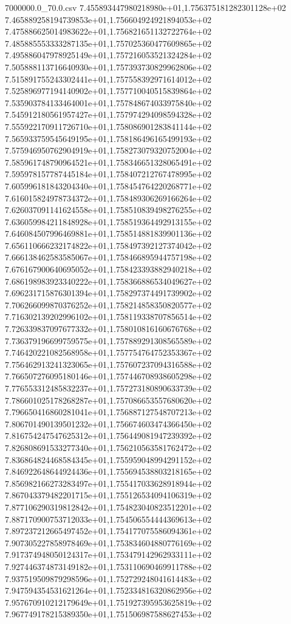 \begin{filecontents*}{7000000.0_70.0.csv}
7.455893447980218980e+01,1.756375181282301128e+02
7.465889258194739853e+01,1.756604924921894053e+02
7.475886625014983622e+01,1.756821651132722764e+02
7.485885553333287135e+01,1.757025360477609865e+02
7.495886047978925149e+01,1.757216053521324284e+02
7.505888113716640930e+01,1.757393730829962806e+02
7.515891755243302441e+01,1.757558392971614012e+02
7.525896977194140902e+01,1.757710040515839864e+02
7.535903784133464001e+01,1.757848674033975840e+02
7.545912180561957427e+01,1.757974294098594328e+02
7.555922170911726710e+01,1.758086901283841144e+02
7.565933759545649195e+01,1.758186496165499193e+02
7.575946950762904919e+01,1.758273079320752004e+02
7.585961748790964521e+01,1.758346651328065491e+02
7.595978157787445184e+01,1.758407212767478995e+02
7.605996181843204340e+01,1.758454764220268771e+02
7.616015824978734372e+01,1.758489306269166264e+02
7.626037091141624558e+01,1.758510839498276255e+02
7.636059984211848928e+01,1.758519364492913155e+02
7.646084507996469881e+01,1.758514881839901136e+02
7.656110666232174822e+01,1.758497392127374042e+02
7.666138462583585067e+01,1.758466895944757198e+02
7.676167900640695052e+01,1.758423393882940218e+02
7.686198983923340222e+01,1.758366886534049627e+02
7.696231715876301394e+01,1.758297374491739902e+02
7.706266099870376252e+01,1.758214858350820577e+02
7.716302139202996102e+01,1.758119338707856514e+02
7.726339837097677332e+01,1.758010816160676768e+02
7.736379196699759575e+01,1.757889291308565589e+02
7.746420221082568958e+01,1.757754764752353367e+02
7.756462913241323065e+01,1.757607237094316588e+02
7.766507276095180146e+01,1.757446708938605298e+02
7.776553312485832237e+01,1.757273180890633739e+02
7.786601025178268287e+01,1.757086653557680620e+02
7.796650416860281041e+01,1.756887127548707213e+02
7.806701490139501232e+01,1.756674603474366450e+02
7.816754247547625312e+01,1.756449081947239392e+02
7.826808691533277340e+01,1.756210563581762472e+02
7.836864824468584345e+01,1.755959048994291152e+02
7.846922648644924436e+01,1.755694538803218165e+02
7.856982166273283497e+01,1.755417033628918944e+02
7.867043379482201715e+01,1.755126534094106319e+02
7.877106290319812842e+01,1.754823040823512201e+02
7.887170900753712033e+01,1.754506554444369613e+02
7.897237212665497452e+01,1.754177075586094361e+02
7.907305227858978469e+01,1.753834604880776169e+02
7.917374948050124317e+01,1.753479142962933111e+02
7.927446374873149182e+01,1.753110690469911788e+02
7.937519509879298596e+01,1.752729248041614483e+02
7.947594354531621264e+01,1.752334816320862956e+02
7.957670910212179649e+01,1.751927395953625819e+02
7.967749178215389350e+01,1.751506987588627453e+02

\end{filecontents*}
